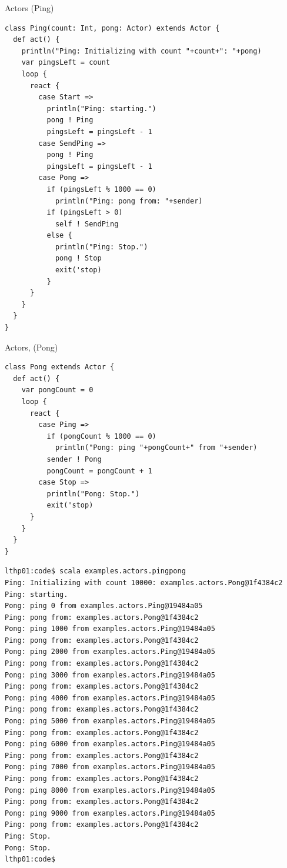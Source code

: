 \documentclass[t]{beamer}
\begin{document}
\begin{frame}[fragile]{Actors (Ping)}
  \begin{tiny}
  \begin{verbatim}
class Ping(count: Int, pong: Actor) extends Actor {
  def act() {
    println("Ping: Initializing with count "+count+": "+pong)
    var pingsLeft = count
    loop {
      react {
        case Start =>
          println("Ping: starting.")
          pong ! Ping
          pingsLeft = pingsLeft - 1
        case SendPing =>
          pong ! Ping
          pingsLeft = pingsLeft - 1
        case Pong =>
          if (pingsLeft % 1000 == 0)
            println("Ping: pong from: "+sender)
          if (pingsLeft > 0)
            self ! SendPing
          else {
            println("Ping: Stop.")
            pong ! Stop
            exit('stop)
          }
      }
    }
  }
}
  \end{verbatim}
  \end{tiny}
  \note{}
\end{frame}

\begin{frame}[fragile]{Actors, (Pong)}
  \begin{tiny}
  \begin{verbatim}
class Pong extends Actor {
  def act() {
    var pongCount = 0
    loop {
      react {
        case Ping =>
          if (pongCount % 1000 == 0)
            println("Pong: ping "+pongCount+" from "+sender)
          sender ! Pong
          pongCount = pongCount + 1
        case Stop =>
          println("Pong: Stop.")
          exit('stop)
      }
    }
  }
}
  \end{verbatim}
  \end{tiny}
  \note{}
\end{frame}

\begin{frame}[fragile]{}
  \begin{tiny}
  \begin{verbatim}
lthp01:code$ scala examples.actors.pingpong
Ping: Initializing with count 10000: examples.actors.Pong@1f4384c2
Ping: starting.
Pong: ping 0 from examples.actors.Ping@19484a05
Ping: pong from: examples.actors.Pong@1f4384c2
Pong: ping 1000 from examples.actors.Ping@19484a05
Ping: pong from: examples.actors.Pong@1f4384c2
Pong: ping 2000 from examples.actors.Ping@19484a05
Ping: pong from: examples.actors.Pong@1f4384c2
Pong: ping 3000 from examples.actors.Ping@19484a05
Ping: pong from: examples.actors.Pong@1f4384c2
Pong: ping 4000 from examples.actors.Ping@19484a05
Ping: pong from: examples.actors.Pong@1f4384c2
Pong: ping 5000 from examples.actors.Ping@19484a05
Ping: pong from: examples.actors.Pong@1f4384c2
Pong: ping 6000 from examples.actors.Ping@19484a05
Ping: pong from: examples.actors.Pong@1f4384c2
Pong: ping 7000 from examples.actors.Ping@19484a05
Ping: pong from: examples.actors.Pong@1f4384c2
Pong: ping 8000 from examples.actors.Ping@19484a05
Ping: pong from: examples.actors.Pong@1f4384c2
Pong: ping 9000 from examples.actors.Ping@19484a05
Ping: pong from: examples.actors.Pong@1f4384c2
Ping: Stop.
Pong: Stop.
lthp01:code$ 
  \end{verbatim}
  \end{tiny}
  \note{}
\end{frame}
\end{document}
